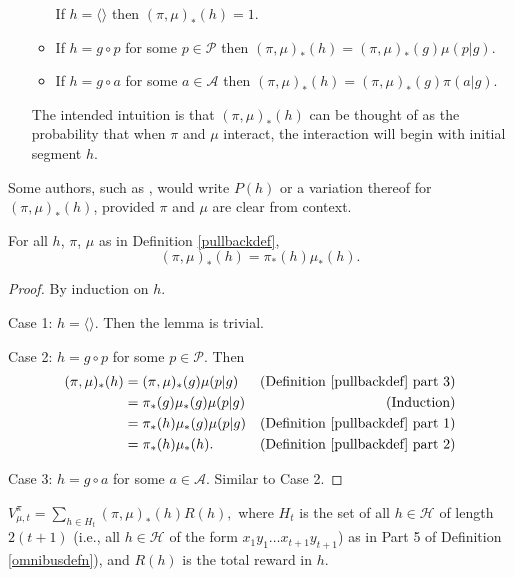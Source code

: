 \documentclass[runningheads]{llncs}
\begin{document}
\begin{definition}
\begin{enumerate}
\begin{itemize}
            If $h=\langle\rangle$ then $(\pi,\mu)_*(h)=1$.
            \item
            If $h=g\circ p$ for some $p\in\mathcal P$ then
            $(\pi,\mu)_*(h)=(\pi,\mu)_*(g)\mu(p|g)$.
            \item
            If $h=g\circ a$ for some $a\in\mathcal A$ then
            $(\pi,\mu)_*(h)=(\pi,\mu)_*(g)\pi(a|g)$.
        \end{itemize}
        The intended intuition is that $(\pi,\mu)_*(h)$ can be thought of as
        the probability that when $\pi$ and $\mu$ interact, the interaction
        will begin with initial segment $h$.
    \end{enumerate}
\end{definition}

Some authors, such as \cite{hutter2009discrete}, would write $P(h)$ or a variation thereof
for $(\pi,\mu)_*(h)$, provided $\pi$ and $\mu$ are clear from context.

\begin{lemma}
\label{factorizationlemma}
    For all $h$, $\pi$, $\mu$ as in Definition \ref{pullbackdef},
    \[
        (\pi,\mu)_*(h) = \pi_*(h)\mu_*(h).
    \]
\end{lemma}

\begin{proof}
    By induction on $h$.

    Case 1: $h=\langle\rangle$. Then the lemma is trivial.

    Case 2: $h=g\circ p$ for some $p\in\mathcal P$.
        Then
        \begin{align*}
            (\pi,\mu)_*(h)
                &= (\pi,\mu)_*(g)\mu(p|g)
                    &\mbox{(Definition \ref{pullbackdef} part 3)}\\
                &= \pi_*(g)\mu_*(g)\mu(p|g)
                    &\mbox{(Induction)}\\
                &= \pi_*(h)\mu_*(g)\mu(p|g)
                    &\mbox{(Definition \ref{pullbackdef} part 1)}\\
                &= \pi_*(h)\mu_*(h).
                    &\mbox{(Definition \ref{pullbackdef} part 2)}
        \end{align*}

    Case 3: $h=g\circ a$ for some $a\in\mathcal A$.
        Similar to Case 2.
\end{proof}

\begin{lemma}
\label{basicprobabilitylemma}
    $V^\pi_{\mu,t}=\sum_{h\in H_t}(\pi,\mu)_*(h)R(h),$
    where $H_t$ is the set of all $h\in\mathcal H$
    of length $2(t+1)$ (i.e., all $h\in\mathcal H$ of the form
    $x_1y_1\ldots x_{t+1}y_{t+1}$)
    as in Part 5 of Definition \ref{omnibusdefn}),
    and $R(h)$ is the total reward in $h$.
\end{lemma}
\end{document}
